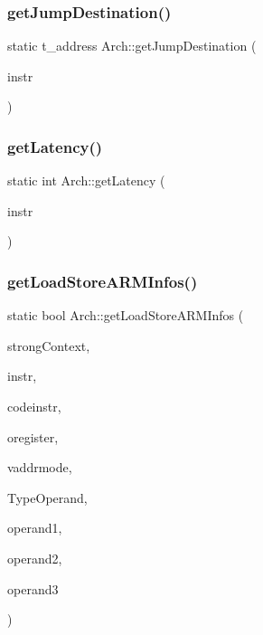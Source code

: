 \mbox{\label{classArch_a14e634f478d8e7f6b76680184ffdddaf}} 
\subsubsection{\texorpdfstring{get\+Jump\+Destination()}{getJumpDestination()}}
{\footnotesize\ttfamily static t\+\_\+address Arch\+::get\+Jump\+Destination (\begin{DoxyParamCaption}\item[{const \hyperlink{classObjdumpInstruction}{Objdump\+Instruction} \&}]{instr }\end{DoxyParamCaption})\hspace{0.3cm}{\ttfamily [static]}}

\mbox{\label{classArch_a4d1796b17b9dbaabed38ab10b8057013}} 
\subsubsection{\texorpdfstring{get\+Latency()}{getLatency()}}
{\footnotesize\ttfamily static int Arch\+::get\+Latency (\begin{DoxyParamCaption}\item[{const string \&}]{instr }\end{DoxyParamCaption})\hspace{0.3cm}{\ttfamily [static]}}

\mbox{\label{classArch_a05769e18b70c873d0eea0c9f220dabda}} 
\subsubsection{\texorpdfstring{get\+Load\+Store\+A\+R\+M\+Infos()}{getLoadStoreARMInfos()}}
{\footnotesize\ttfamily static bool Arch\+::get\+Load\+Store\+A\+R\+M\+Infos (\begin{DoxyParamCaption}\item[{bool}]{strong\+Context,  }\item[{string \&}]{instr,  }\item[{string \&}]{codeinstr,  }\item[{string \&}]{oregister,  }\item[{\hyperlink{arch_8h_aa5cfff0cd9c5ad5ebda7aeecc4a50c2b}{Addressing\+Mode} $\ast$}]{vaddrmode,  }\item[{\hyperlink{arch_8h_a63b66e201ffc27bbc8f89c8808382044}{offset\+Type} $\ast$}]{Type\+Operand,  }\item[{string \&}]{operand1,  }\item[{string \&}]{operand2,  }\item[{string \&}]{operand3 }\end{DoxyParamCaption})\hspace{0.3cm}{\ttfamily [static]}}

